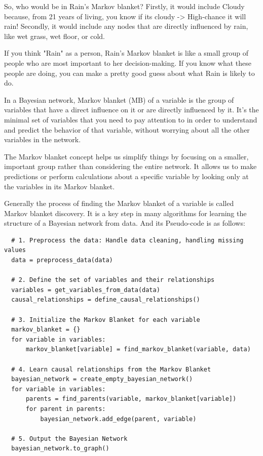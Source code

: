 \documentclass{article}
\begin{document}
So, who would be in Rain's Markov blanket? Firstly, it would include Cloudy because, from 21 years of living, you know if its cloudy -> High-chance it will rain! Secondly, it would include any nodes that are directly influenced by rain, like wet grass, wet floor, or cold.

If you think "Rain" as a person, Rain's Markov blanket is like a small group of people who are most important to her decision-making. If you know what these people are doing, you can make a pretty good guess about what Rain is likely to do.

In a Bayesian network, Markov blanket (MB) of a variable is the group of variables that have a direct influence on it or are directly influenced by it. It's the minimal set of variables that you need to pay attention to in order to understand and predict the behavior of that variable, without worrying about all the other variables in the network.

The Markov blanket concept helps us simplify things by focusing on a smaller, important group rather than considering the entire network. It allows us to make predictions or perform calculations about a specific variable by looking only at the variables in its Markov blanket.

Generally the process of finding the Markov blanket of a variable is called Markov blanket discovery. It is a key step in many algorithms for learning the structure of a Bayesian network from data. And its Pseudo-code is as follows:
\begin{lstlisting}
  # 1. Preprocess the data: Handle data cleaning, handling missing values
  data = preprocess_data(data)
  
  # 2. Define the set of variables and their relationships
  variables = get_variables_from_data(data)
  causal_relationships = define_causal_relationships()
  
  # 3. Initialize the Markov Blanket for each variable
  markov_blanket = {}
  for variable in variables:
      markov_blanket[variable] = find_markov_blanket(variable, data)
  
  # 4. Learn causal relationships from the Markov Blanket
  bayesian_network = create_empty_bayesian_network()
  for variable in variables:
      parents = find_parents(variable, markov_blanket[variable])
      for parent in parents:
          bayesian_network.add_edge(parent, variable)
  
  # 5. Output the Bayesian Network
  bayesian_network.to_graph()
  \end{lstlisting}
\end{document}
